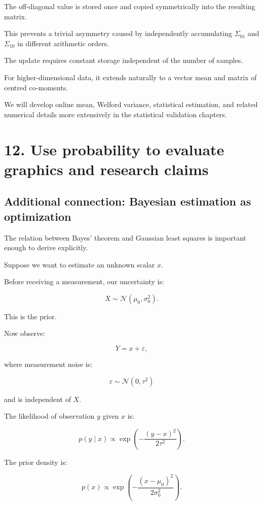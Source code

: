 The off-diagonal value is stored once and copied symmetrically into the resulting matrix.

This prevents a trivial asymmetry caused by independently accumulating \(\Sigma_{01}\) and \(\Sigma_{10}\) in different arithmetic orders.

The update requires constant storage independent of the number of samples.

For higher-dimensional data, it extends naturally to a vector mean and matrix of centred co-moments.

We will develop online mean, Welford variance, statistical estimation, and related numerical details more extensively in the statistical validation chapters.

\section{12. Use probability to evaluate graphics and research claims}\label{02-foundations-ii-ch031-use-probability-to-evaluate-graphics-and-research-claims}

\subsection{Additional connection: Bayesian estimation as optimization}\label{02-foundations-ii-ch031-additional-connection-bayesian-estimation-as-optimization}

The relation between Bayes' theorem and Gaussian least squares is important enough to derive explicitly.

Suppose we want to estimate an unknown scalar \(x\).

Before receiving a measurement, our uncertainty is:

\[
 X\sim\mathcal N(\mu_0,\sigma_0^2).
\]

This is the prior.

Now observe:

\[
 Y=x+\varepsilon,
\]

where measurement noise is:

\[
 \varepsilon\sim\mathcal N(0,\tau^2)
\]

and is independent of \(X\).

The likelihood of observation \(y\) given \(x\) is:

\[
 p(y\mid x) \propto \exp\left( -\frac{(y-x)^2}{2\tau^2} \right).
\]

The prior density is:

\[
 p(x)\propto \exp\left( -\frac{(x-\mu_0)^2}{2\sigma_0^2} \right).
\]

